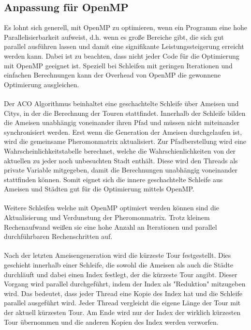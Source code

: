 \subsection*{Anpassung für OpenMP}

Es lohnt sich generell, mit OpenMP zu optimieren, wenn ein Programm eine hohe Parallelisierbarkeit aufweist, d.h. wenn es große Bereiche gibt, 
die sich gut parallel ausführen lassen und damit eine signifikante Leistungssteigerung erreicht werden kann.
Dabei ist zu beachten, dass nicht jeder Code für die Optimierung mit OpenMP geeignet ist. Speziell bei Schleifen mit geringen Iterationen und einfachen Berechnungen kann der Overhead von OpenMP die gewonnene Optimierung ausgleichen.
\\\\
Der ACO Algorithmus beinhaltet eine geschachtelte Schleife über Ameisen und Citys, in der die Berechnung der Touren stattfindet.
Innerhalb der Schleife bilden die Ameisen unabhängig voneinander ihren Pfad und müssen nicht miteinander synchronisiert werden.
Erst wenn die Generation der Ameisen durchgelaufen ist, wird die gemeinsame Pheromonmatrix aktualisiert.
Zur Pfadberstellung wird eine Wahrscheinlichkeitstabelle berechnet, welche die Wahrschienlichkeiten von der aktuellen zu jeder noch unbesuchten Stadt enthält.
Diese wird den Threads als private Variable mitgegeben, damit die Berechnungen unabhängig voneinander stattfinden können.
Somit eignet sich die innere geschachtelte Schleife aus Ameisen und Städten gut für die Optimierung mittels OpenMP.
\\\\
Weitere Schleifen welche mit OpenMP optimiert werden können sind die Aktualisierung und Verdunstung der Pheromonmatrix.
Trotz kleinem Rechenaufwand weißen sie eine hohe Anzahl an Iterationen und parallel durchführbaren Rechenschritten auf.
\\\\
Nach der letzten Ameisengeneration wird die kürzeste Tour festgestellt.
Dies geschieht innerhalb einer Schleife, die sowohl die Ameisen als auch die Städte durchläuft und dabei einen Index festlegt, der die kürzeste Tour angibt. 
Dieser Vorgang wird parallel durchgeführt, indem der Index als "Reduktion" mitzugeben wird. 
Das bedeutet, dass jeder Thread eine Kopie des Index hat und die Schleife parallel ausgeführt wird. 
Jeder Thread vergleicht die eigene Länge der Tour mit der aktuell kürzesten Tour. 
Am Ende wird nur der Index der wirklich kürzesten Tour übernommen und die anderen Kopien des Index werden verworfen.


